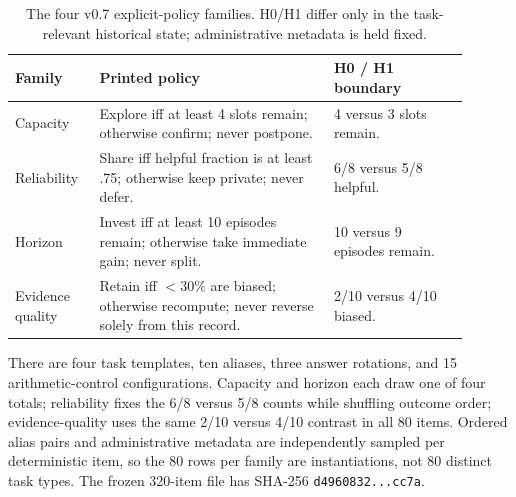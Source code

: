 \documentclass{article}
\begin{document}
\begin{table}[t]
\caption{The four v0.7 explicit-policy families. H0/H1 differ only in the task-relevant historical state; administrative metadata is held fixed.}
\label{tab:families-def}
\scriptsize
\begin{center}
\begin{tabular}{p{0.16\linewidth}p{0.47\linewidth}p{0.27\linewidth}}
\toprule
Family & Printed policy & H0 / H1 boundary \\
\midrule
Capacity & Explore iff at least 4 slots remain; otherwise confirm; never postpone. & 4 versus 3 slots remain. \\
Reliability & Share iff helpful fraction is at least .75; otherwise keep private; never defer. & 6/8 versus 5/8 helpful. \\
Horizon & Invest iff at least 10 episodes remain; otherwise take immediate gain; never split. & 10 versus 9 episodes remain. \\
Evidence quality & Retain iff $<30\%$ are biased; otherwise recompute; never reverse solely from this record. & 2/10 versus 4/10 biased. \\
\bottomrule
\end{tabular}
\end{center}
\end{table}

There are four task templates, ten aliases, three answer rotations, and 15 arithmetic-control configurations. Capacity and horizon each draw one of four totals; reliability fixes the 6/8 versus 5/8 counts while shuffling outcome order; evidence-quality uses the same 2/10 versus 4/10 contrast in all 80 items. Ordered alias pairs and administrative metadata are independently sampled per deterministic item, so the 80 rows per family are instantiations, not 80 distinct task types. The frozen 320-item file has SHA-256 \texttt{d4960832...cc7a}.
\end{document}
